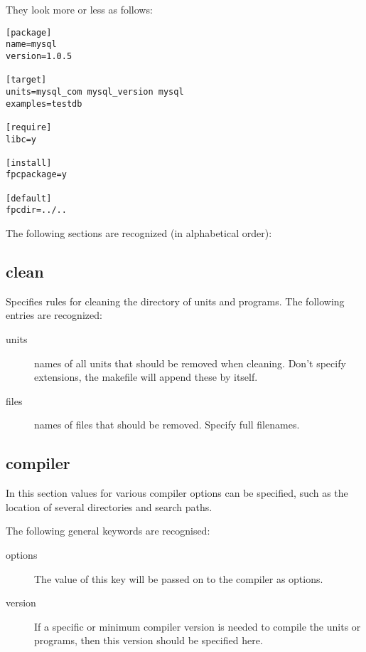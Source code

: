 {They look more or less as follows:
\begin{verbatim}
[package]
name=mysql
version=1.0.5

[target]
units=mysql_com mysql_version mysql
examples=testdb

[require]
libc=y

[install]
fpcpackage=y

[default]
fpcdir=../..
\end{verbatim}

The following sections are recognized (in alphabetical order):

\subsection{clean}
Specifies rules for cleaning the directory of units and programs.
The following entries are recognized:
\begin{description}
\item[units] names of all units that should be removed when cleaning.
Don't specify extensions, the makefile will append these by itself.
\item[files] names of files that should be removed. Specify full filenames.
\end{description}

\subsection{compiler}
In this section values for various compiler options can be specified, 
such as the location of several directories and search paths.

The following general keywords are recognised:
\begin{description}
\item[options] The value of this key will be passed on to the compiler as
options.
\item[version] If a specific or minimum compiler version is needed to
compile the units or programs, then this version should be specified here.
\end{description}

}
